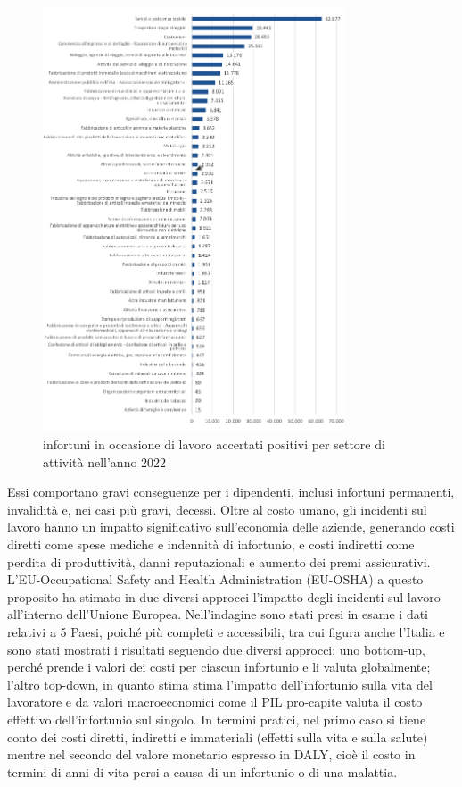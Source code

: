 \begin{figure}[htbp]
    \centering
    \includegraphics[width=0.8\textwidth]{figures/infortuni_industria_e_servizi.png}
    \caption{infortuni in occasione di lavoro accertati positivi per settore di attività nell'anno 2022}
    \label{fig:inforsplit}
\end{figure}

Essi comportano gravi conseguenze per i dipendenti, inclusi infortuni permanenti, invalidità e, nei casi più gravi, decessi. Oltre al costo umano, gli incidenti sul lavoro hanno un impatto significativo sull'economia delle aziende, generando costi diretti come spese mediche e indennità di infortunio, e costi indiretti come perdita di produttività, danni reputazionali e aumento dei premi assicurativi. L'EU-Occupational Safety and Health Administration (EU-OSHA) a questo proposito ha stimato in due diversi approcci l'impatto degli incidenti sul lavoro all'interno dell'Unione Europea\cite{osha-eu}. Nell'indagine sono stati presi in esame i dati relativi a 5 Paesi, poiché più completi e accessibili, tra cui figura anche l'Italia e sono stati mostrati i risultati seguendo due diversi approcci: uno bottom-up, perché prende i valori dei costi per ciascun infortunio e li valuta globalmente; l'altro top-down, in quanto stima stima l'impatto dell'infortunio sulla vita del lavoratore e da valori macroeconomici come il PIL pro-capite valuta il costo effettivo dell'infortunio sul singolo. In termini pratici, nel primo caso si tiene conto dei costi diretti, indiretti e immateriali (effetti sulla vita e sulla salute) mentre nel secondo del valore monetario espresso in DALY, cioè il costo in termini di anni di vita persi a causa di un infortunio o di una malattia.

